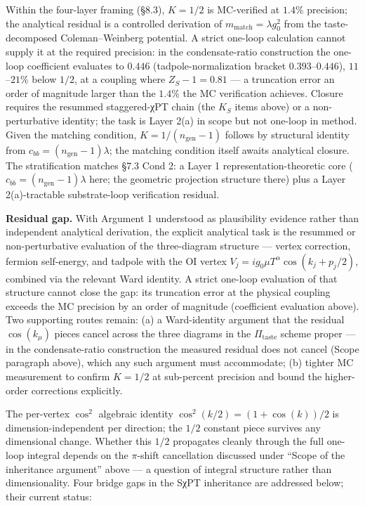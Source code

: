 \documentclass[
]{article}
\begin{document}
Within the four-layer framing (§8.3), \(K = 1/2\) is MC-verified at
\(1.4\%\) precision; the analytical residual is a controlled derivation
of \(m_{\text{match}} = \lambda g_0^2\) from the taste-decomposed
Coleman--Weinberg potential. A strict one-loop calculation cannot supply
it at the required precision: in the condensate-ratio construction the
one-loop coefficient evaluates to \(0.446\) (tadpole-normalization
bracket \(0.393\)--\(0.446\)), \(11\)--\(21\%\) below \(1/2\), at a
coupling where \(Z_S - 1 = 0.81\) --- a truncation error an order of
magnitude larger than the \(1.4\%\) the MC verification achieves.
Closure requires the resummed staggered-χPT chain (the \(K_S\) items
above) or a non-perturbative identity; the task is Layer 2(a) in scope
but not one-loop in method. Given the matching condition,
\(K = 1/(n_{\text{gen}}-1)\) follows by structural identity from
\(c_{bb} = (n_{\text{gen}}-1)\lambda\); the matching condition itself
awaits analytical closure. The stratification matches §7.3 Cond 2: a
Layer 1 representation-theoretic core
(\(c_{bb} = (n_{\text{gen}}-1)\lambda\) here; the geometric projection
structure there) plus a Layer 2(a)-tractable substrate-loop verification
residual.

\textbf{Residual gap.} With Argument 1 understood as plausibility
evidence rather than independent analytical derivation, the explicit
analytical task is the resummed or non-perturbative evaluation of the
three-diagram structure --- vertex correction, fermion self-energy, and
tadpole with the OI vertex \(V_j = ig_0\mu T^\alpha\cos(k_j + p_j/2)\),
combined via the relevant Ward identity. A strict one-loop evaluation of
that structure cannot close the gap: its truncation error at the
physical coupling exceeds the MC precision by an order of magnitude
(coefficient evaluation above). Two supporting routes remain: (a) a
Ward-identity argument that the residual \(\cos(k_\mu)\) pieces cancel
across the three diagrams in the \(\Pi_{\text{taste}}\) scheme proper
--- in the condensate-ratio construction the measured residual does not
cancel (Scope paragraph above), which any such argument must
accommodate; (b) tighter MC measurement to confirm \(K = 1/2\) at
sub-percent precision and bound the higher-order corrections explicitly.

The per-vertex \(\cos^2\) algebraic identity
\(\cos^2(k/2) = (1+\cos(k))/2\) is dimension-independent per direction;
the \(1/2\) constant piece survives any dimensional change. Whether this
\(1/2\) propagates cleanly through the full one-loop integral depends on
the \(\pi\)-shift cancellation discussed under ``Scope of the
inheritance argument'' above --- a question of integral structure rather
than dimensionality. Four bridge gaps in the SχPT inheritance are
addressed below; their current status:
\end{document}
